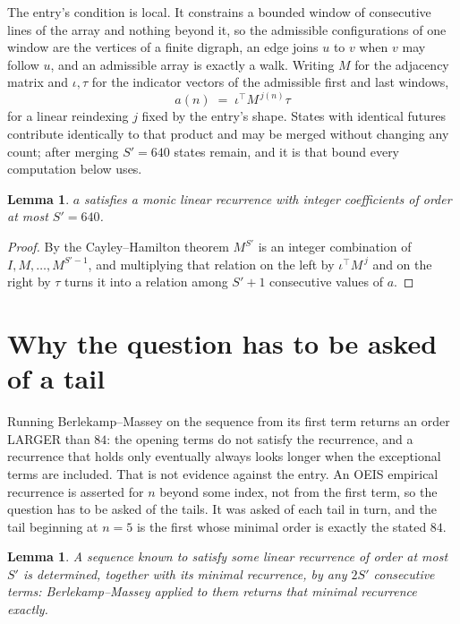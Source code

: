 \documentclass[11pt,a4paper]{article}
\theoremstyle{plain}
\newtheorem{lemma}[theorem]{Lemma}
\theoremstyle{definition}
\begin{document}
The entry's condition is local. It constrains a bounded window of consecutive lines of the
array and nothing beyond it, so the admissible configurations of one window are the vertices of
a finite digraph, an edge joins $u$ to $v$ when $v$ may follow $u$, and an admissible array is
exactly a walk. Writing $M$ for the adjacency matrix and $\iota,\tau$ for the indicator vectors
of the admissible first and last windows,
\[
a(n)\;=\;\iota^{\!\top}M^{\,j(n)}\tau
\]
for a linear reindexing $j$ fixed by the entry's shape. States with identical futures
contribute identically to that product and may be merged without changing any count; after
merging $S'=640$ states remain, and it is that bound every computation below uses.

\begin{lemma}\label{lem:cf}
$a$ satisfies a monic linear recurrence with integer coefficients of order at most $S'=640$.
\end{lemma}

\begin{proof}
By the Cayley--Hamilton theorem $M^{S'}$ is an integer combination of $I,M,\dots,M^{S'-1}$,
and multiplying that relation on the left by $\iota^{\!\top}M^{\,j}$ and on the right by
$\tau$ turns it into a relation among $S'+1$ consecutive values of $a$.
\end{proof}

\section{Why the question has to be asked of a tail}

Running Berlekamp--Massey on the sequence from its first term returns an order LARGER than $84$: the opening terms do not satisfy the recurrence, and a recurrence that holds only eventually always looks longer when the exceptional terms are included. That is not evidence against the entry. An OEIS empirical recurrence is asserted for $n$ beyond some index, not from the first term, so the question has to be asked of the tails. It was asked of each tail in turn, and the tail beginning at $n=5$ is the first whose minimal order is exactly the stated $84$.

\begin{lemma}\label{lem:bm}
A sequence known to satisfy some linear recurrence of order at most $S'$ is determined,
together with its minimal recurrence, by any $2S'$ consecutive terms: Berlekamp--Massey applied
to them returns that minimal recurrence exactly.
\end{lemma}
\end{document}
